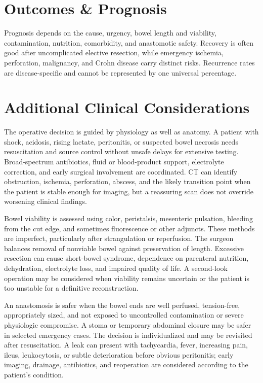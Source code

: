 \section*{Outcomes \& Prognosis}
Prognosis depends on the cause, urgency, bowel length and viability, contamination, nutrition, comorbidity, and anastomotic safety. Recovery is often good after uncomplicated elective resection, while emergency ischemia, perforation, malignancy, and Crohn disease carry distinct risks. Recurrence rates are disease-specific and cannot be represented by one universal percentage.

\section*{Additional Clinical Considerations}
The operative decision is guided by physiology as well as anatomy. A patient with shock, acidosis, rising lactate, peritonitis, or suspected bowel necrosis needs resuscitation and source control without unsafe delays for extensive testing. Broad-spectrum antibiotics, fluid or blood-product support, electrolyte correction, and early surgical involvement are coordinated. CT can identify obstruction, ischemia, perforation, abscess, and the likely transition point when the patient is stable enough for imaging, but a reassuring scan does not override worsening clinical findings.

Bowel viability is assessed using color, peristalsis, mesenteric pulsation, bleeding from the cut edge, and sometimes fluorescence or other adjuncts. These methods are imperfect, particularly after strangulation or reperfusion. The surgeon balances removal of nonviable bowel against preservation of length. Excessive resection can cause short-bowel syndrome, dependence on parenteral nutrition, dehydration, electrolyte loss, and impaired quality of life. A second-look operation may be considered when viability remains uncertain or the patient is too unstable for a definitive reconstruction.

An anastomosis is safer when the bowel ends are well perfused, tension-free, appropriately sized, and not exposed to uncontrolled contamination or severe physiologic compromise. A stoma or temporary abdominal closure may be safer in selected emergency cases. The decision is individualized and may be revisited after resuscitation. A leak can present with tachycardia, fever, increasing pain, ileus, leukocytosis, or subtle deterioration before obvious peritonitis; early imaging, drainage, antibiotics, and reoperation are considered according to the patient's condition.

